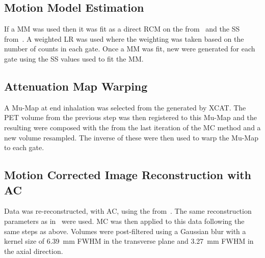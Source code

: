     \vspace{-0.4cm}
    
    \subsection{Motion Model Estimation} \label{sec:motion_model_estimation}
        If a \gls{MM} was used then it was fit as a direct \gls{RCM} on the  from~ and the \gls{SS} from~. A weighted \gls{LR} was used where the weighting was taken based on the number of counts in each gate. Once a \gls{MM} was fit, new  were generated for each gate using the \gls{SS} values used to fit the \gls{MM}.
    
    \vspace{-0.4cm}
    
    \subsection{Attenuation Map Warping} \label{sec:attenuation_map_warping}
        A \gls{Mu-Map} at end inhalation was selected from the  generated by \gls{XCAT}. The \gls{PET} volume from the previous step was then registered to this \gls{Mu-Map} and the resulting  were composed with the  from the last iteration of the \gls{MC} method and a new volume resampled. The inverse of these  were then used to warp the \gls{Mu-Map} to each gate.
    
    \vspace{-0.4cm}
    
    \subsection{Motion Corrected Image Reconstruction with AC} \label{sec:attenuation_corrected_image_reconstruction}
        Data was re-reconstructed, with \gls{AC}, using the  from~. The same reconstruction parameters as in~ were used. \gls{MC} was then applied to this data following the same steps as above. Volumes were post-filtered using a Gaussian blur with a kernel size of \SI{6.39}{\milli\metre} \gls{FWHM} in the transverse plane and \SI{3.27}{\milli\metre} \gls{FWHM} in the axial direction.
    
    \vspace{-0.4cm}
    
